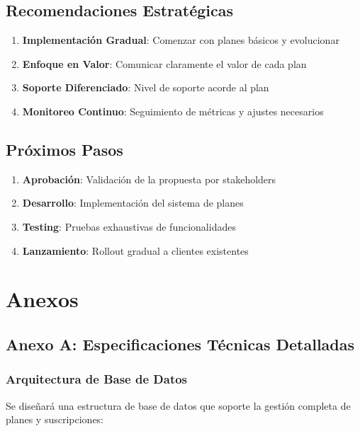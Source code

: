 \documentclass[12pt,a4paper]{article}
\begin{document}
\subsection{Recomendaciones Estratégicas}

\begin{enumerate}
    \item \textbf{Implementación Gradual}: Comenzar con planes básicos y evolucionar
    \item \textbf{Enfoque en Valor}: Comunicar claramente el valor de cada plan
    \item \textbf{Soporte Diferenciado}: Nivel de soporte acorde al plan
    \item \textbf{Monitoreo Continuo}: Seguimiento de métricas y ajustes necesarios
\end{enumerate}

\subsection{Próximos Pasos}

\begin{enumerate}
    \item \textbf{Aprobación}: Validación de la propuesta por stakeholders
    \item \textbf{Desarrollo}: Implementación del sistema de planes
    \item \textbf{Testing}: Pruebas exhaustivas de funcionalidades
    \item \textbf{Lanzamiento}: Rollout gradual a clientes existentes
\end{enumerate}

\section{Anexos}

\subsection{Anexo A: Especificaciones Técnicas Detalladas}

\subsubsection{Arquitectura de Base de Datos}

Se diseñará una estructura de base de datos que soporte la gestión completa de planes y suscripciones:
\end{document}

